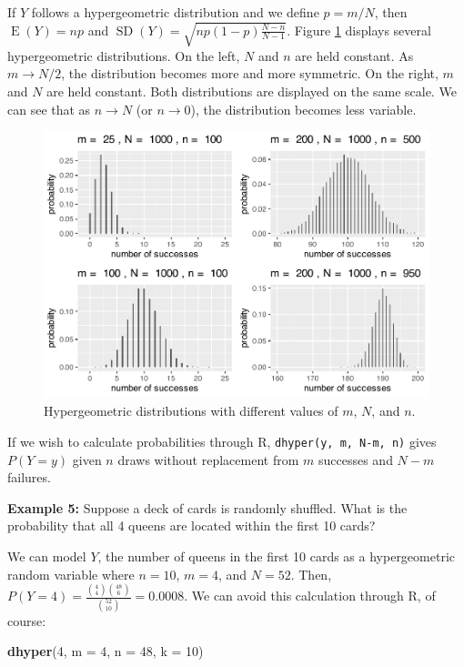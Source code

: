 \documentclass[
]{krantz}
\newenvironment{Shaded}{\begin{snugshade}}{\end{snugshade}}
\newcommand{\AttributeTok}[1]{\textcolor[rgb]{0.27,0.27,0.27}{#1}}
\newcommand{\DecValTok}[1]{\textcolor[rgb]{0.06,0.06,0.06}{#1}}
\newcommand{\FunctionTok}[1]{\textcolor[rgb]{0.27,0.27,0.27}{\textbf{#1}}}
\newcommand{\NormalTok}[1]{#1}
\newcommand{\E}{\operatorname{E}}
\newcommand{\SD}{\operatorname{SD}}
\begin{document}
If \(Y\) follows a hypergeometric distribution and we define \(p = m/N\), then \(\E(Y) = np\) and \(\SD(Y) = \sqrt{np(1-p)\frac{N-n}{N-1}}\). Figure \ref{fig:multHyper} displays several hypergeometric distributions. On the left, \(N\) and \(n\) are held constant. As \(m \rightarrow N/2\), the distribution becomes more and more symmetric. On the right, \(m\) and \(N\) are held constant. Both distributions are displayed on the same scale. We can see that as \(n \rightarrow N\) (or \(n \rightarrow 0\)), the distribution becomes less variable.



\begin{figure}

{\centering \includegraphics[width=0.6\linewidth]{bookdown-BeyondMLR_files/figure-latex/multHyper-1} 

}

\caption{Hypergeometric distributions with different values of \(m\), \(N\), and \(n\).}\label{fig:multHyper}
\end{figure}

If we wish to calculate probabilities through R, \texttt{dhyper(y,\ m,\ N-m,\ n)} gives \(P(Y=y)\) given \(n\) draws without replacement from \(m\) successes and \(N-m\) failures.

\textbf{Example 5:} Suppose a deck of cards is randomly shuffled. What is the probability that all 4 queens are located within the first 10 cards?

We can model \(Y\), the number of queens in the first 10 cards as a hypergeometric random variable where \(n = 10\), \(m = 4\), and \(N = 52\). Then, \(P(Y=4) = \displaystyle \frac{\binom{4}{4}\binom{48}{6}}{\binom{52}{10}} = 0.0008\). We can avoid this calculation through R, of course:

\begin{Shaded}
\begin{Highlighting}[]
\FunctionTok{dhyper}\NormalTok{(}\DecValTok{4}\NormalTok{, }\AttributeTok{m =} \DecValTok{4}\NormalTok{, }\AttributeTok{n =} \DecValTok{48}\NormalTok{, }\AttributeTok{k =} \DecValTok{10}\NormalTok{)}
\end{Highlighting}
\end{Shaded}
\end{document}
